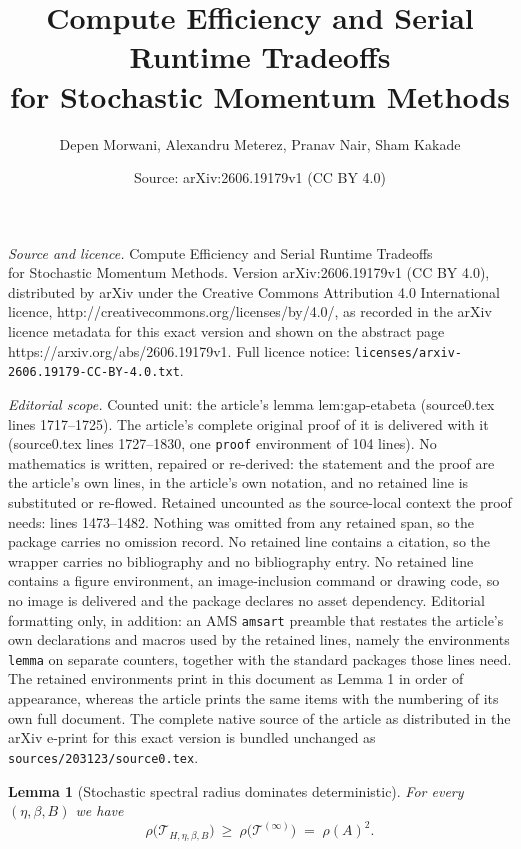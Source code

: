 \documentclass[10pt,a4paper]{amsart}
\title{Compute Efficiency and Serial Runtime Tradeoffs \\for Stochastic Momentum Methods}
\author{Depen Morwani, Alexandru Meterez, Pranav Nair, Sham Kakade}
\date{Source: arXiv:2606.19179v1 (CC BY 4.0)}
\newtheorem{lemma}{Lemma}
\begin{document}
\maketitle

\noindent\emph{Source and licence.} Compute Efficiency and Serial Runtime Tradeoffs \\for Stochastic Momentum Methods. Version arXiv:2606.19179v1 (CC BY 4.0), distributed by arXiv under the Creative Commons Attribution 4.0 International licence, http://creativecommons.org/licenses/by/4.0/, as recorded in the arXiv licence metadata for this exact version and shown on the abstract page https://arxiv.org/abs/2606.19179v1. Full licence notice: \texttt{licenses/arxiv-2606.19179-CC-BY-4.0.txt}.\par\smallskip

\noindent\textit{Editorial scope.} Counted unit: the article's lemma lem:gap-etabeta (source0.tex lines 1717--1725). The article's complete original proof of it is delivered with it (source0.tex lines 1727--1830, one \texttt{proof} environment of 104 lines). No mathematics is written, repaired or re-derived: the statement and the proof are the article's own lines, in the article's own notation, and no retained line is substituted or re-flowed.  Retained uncounted as the source-local context the proof needs: lines 1473--1482.  Nothing was omitted from any retained span, so the package carries no omission record.  No retained line contains a citation, so the wrapper carries no bibliography and no bibliography entry.  No retained line contains a figure environment, an image-inclusion command or drawing code, so no image is delivered and the package declares no asset dependency.  Editorial formatting only, in addition: an AMS \texttt{amsart} preamble that restates the article's own declarations and macros used by the retained lines, namely the environments \texttt{lemma} on separate counters, together with the standard packages those lines need.  The retained environments print in this document as Lemma 1 in order of appearance, whereas the article prints the same items with the numbering of its own full document.  The complete native source of the article as distributed in the arXiv e-print for this exact version is bundled unchanged as \texttt{sources/203123/source0.tex}.
\begin{lemma}[Stochastic spectral radius dominates deterministic]
\label{lem:det_upper_bound}
For every $(\eta,\beta,B)$ we have
\[
\rho\big(\mathcal{T}_{H,\eta,\beta,B}\big)
\ \ge\
\rho\big(\mathcal{T}^{(\infty)}\big)
\;=\; \rho(A)^2.
\]
\end{lemma}
\end{document}
